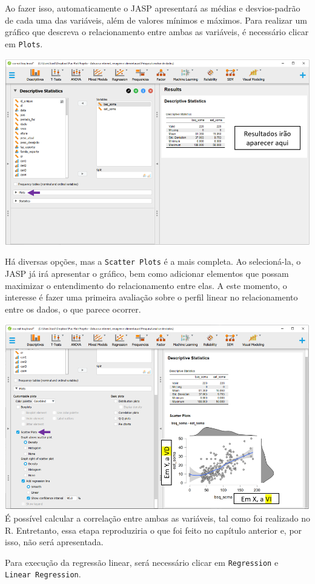 \documentclass[
]{book}
\begin{document}
Ao fazer isso, automaticamente o JASP apresentará as médias e desvios-padrão de cada uma das variáveis, além de valores mínimos e máximos. Para realizar um gráfico que descreva o relacionamento entre ambas as variáveis, é necessário clicar em \texttt{Plots}.

\includegraphics{./img/cap_reg_plot.png}

Há diversas opções, mas a \texttt{Scatter\ Plots} é a mais completa. Ao selecioná-la, o JASP já irá apresentar o gráfico, bem como adicionar elementos que possam maximizar o entendimento do relacionamento entre elas. A este momento, o interesse é fazer uma primeira avaliação sobre o perfil linear no relacionamento entre os dados, o que parece ocorrer.

\includegraphics{./img/cap_reg_plot2.png}
É possível calcular a correlação entre ambas as variáveis, tal como foi realizado no R. Entretanto, essa etapa reproduziria o que foi feito no capítulo anterior e, por isso, não será apresentada.

Para execução da regressão linear, será necessário clicar em \texttt{Regression} e \texttt{Linear\ Regression}.
\end{document}
